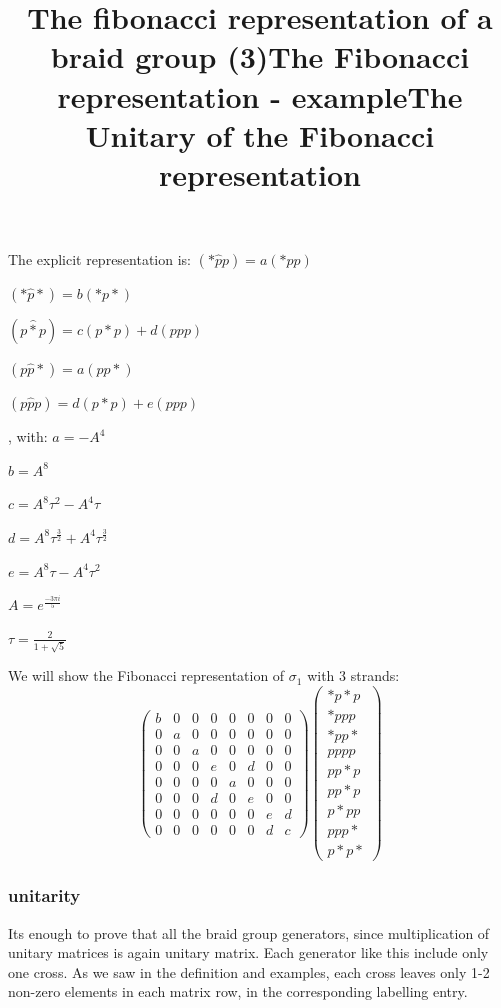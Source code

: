 \documentclass{article}
\begin{document}
{\title{The fibonacci representation of a braid group (3)}
The explicit representation is:
\((*\hat{p}p)=a(*pp)\)

\((*\hat{p}*)=b(*p*)\)

\((p\hat{*}p)=c(p*p)+d(ppp)\)

\((p\hat{p}*)=a(pp*)\)

\((p\hat{p}p)=d(p*p)+e(ppp)\)

, with:
\( a = -A^{4} \)


 \(  b = A^{8}  \)
 
 \(  c = A^{8}\tau^{2} - A^{4}\tau \)
  
 \(  d = A^{8}\tau^{\frac{3}{2}} + A^{4}\tau^{\frac{3}{2}} \) 
 
 \(  e = A^{8}\tau - A^{4}\tau^{2} \) 
 
 \(  A = e^{\frac{-3{\pi}i}{5}} \) 
 
 \(  \tau = \frac{2}{1 + \sqrt{5}} \)


 
\title{The Fibonacci representation - example}
We will show the Fibonacci representation of \(\sigma_{1}\) with 3 strands:
\[
\begin{pmatrix} b & 0 & 0 & 0 & 0 & 0 & 0 & 0 \\ 0 & a & 0 & 0 & 0 & 0 & 0 & 0 \\ 0 & 0 & a & 0 & 0 & 0 & 0 & 0 \\ 0 & 0 & 0 & e & 0 & d & 0 & 0 \\ 0 & 0 & 0 & 0 & a & 0 & 0 & 0 \\ 0 & 0 & 0 & d & 0 & e & 0 & 0 \\0 & 0 & 0 & 0 & 0 & 0 & e & d \\0 & 0 & 0 & 0 & 0 & 0 & d & c \end{pmatrix} 
  \begin{pmatrix} *p*p \\ *ppp \\ *pp* \\ pppp \\ pp*p \\ pp*p \\ p*pp \\ ppp* \\ p*p* \end{pmatrix}
\]

\subsubsection{unitarity}
\title{The Unitary of the Fibonacci representation}
Its enough to prove that all the braid group generators, since multiplication of unitary matrices is again unitary matrix. Each generator like this include only one cross. As we saw in the definition and examples, each cross leaves only 1-2 non-zero elements in each matrix row, in the corresponding labelling entry.

}
\end{document}
